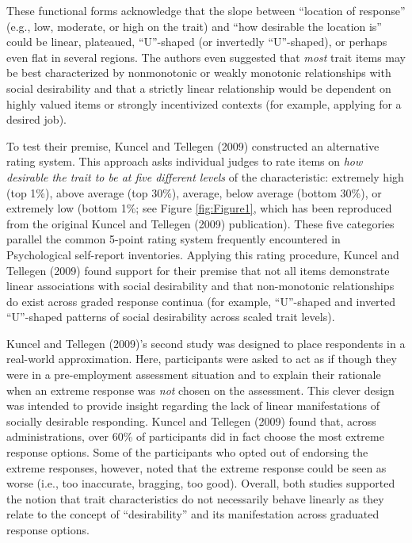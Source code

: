 \documentclass[
  ,jou]{apa6}
\begin{document}
These functional forms acknowledge that the slope between ``location of response'' (e.g., low, moderate, or high on the trait) and ``how desirable the location is'' could be linear, plateaued, ``U''-shaped (or invertedly ``U''-shaped), or perhaps even flat in several regions. The authors even suggested that \emph{most} trait items may be best characterized by nonmonotonic or weakly monotonic relationships with social desirability and that a strictly linear relationship would be dependent on highly valued items or strongly incentivized contexts (for example, applying for a desired job).

To test their premise, Kuncel and Tellegen (2009) constructed an alternative rating system. This approach asks individual judges to rate items on \emph{how desirable the trait to be at five different levels} of the characteristic: extremely high (top 1\%), above average (top 30\%), average, below average (bottom 30\%), or extremely low (bottom 1\%; see Figure \ref{fig:Figure1}, which has been reproduced from the original Kuncel and Tellegen (2009) publication). These five categories parallel the common 5-point rating system frequently encountered in Psychological self-report inventories. Applying this rating procedure, Kuncel and Tellegen (2009) found support for their premise that not all items demonstrate linear associations with social desirability and that non-monotonic relationships do exist across graded response continua (for example, ``U''-shaped and inverted ``U''-shaped patterns of social desirability across scaled trait levels).

Kuncel and Tellegen (2009)'s second study was designed to place respondents in a real-world approximation. Here, participants were asked to act as if though they were in a pre-employment assessment situation and to explain their rationale when an extreme response was \emph{not} chosen on the assessment. This clever design was intended to provide insight regarding the lack of linear manifestations of socially desirable responding. Kuncel and Tellegen (2009) found that, across administrations, over 60\% of participants did in fact choose the most extreme response options. Some of the participants who opted out of endorsing the extreme responses, however, noted that the extreme response could be seen as worse (i.e., too inaccurate, bragging, too good). Overall, both studies supported the notion that trait characteristics do not necessarily behave linearly as they relate to the concept of ``desirability'' and its manifestation across graduated response options.
\end{document}
